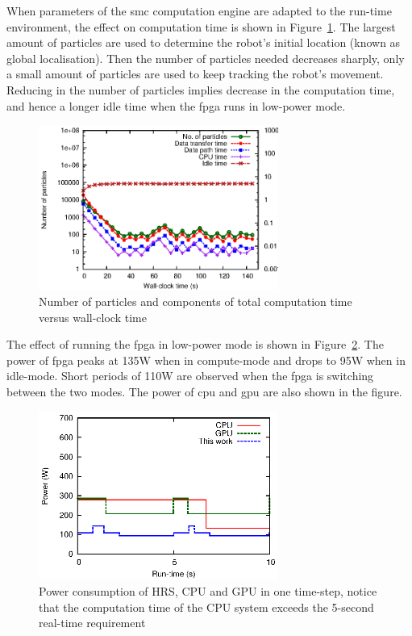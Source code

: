 When parameters of the \gls{smc} computation engine are adapted to the run-time environment, the effect on computation time is shown in Figure~\ref{fig:adaptiveb}.
The largest amount of particles are used to determine the robot's initial location (known as global localisation).
Then the number of particles needed decreases sharply, only a small amount of particles are used to keep tracking the robot's movement.
Reducing in the number of particles implies decrease in the computation time, and hence a longer idle time when the \gls{fpga} runs in low-power mode.

\begin{figure}[t!]
\centering
\includegraphics[width=0.7\textwidth]{4_adaptation/figures/fig_adaptive}
\caption{Number of particles and components of total computation time versus wall-clock time}
\label{fig:adaptiveb}
\end{figure}

The effect of running the \gls{fpga} in low-power mode is shown in Figure~\ref{fig:powerb}.
The power of \gls{fpga} peaks at 135W when in compute-mode and drops to 95W when in idle-mode.
Short periods of 110W are observed when the \gls{fpga} is switching between the two modes.
The power of \gls{cpu} and \gls{gpu} are also shown in the figure.

\begin{figure}[t!]
\centering
\includegraphics[width=0.7\textwidth]{5_tool/figures/fig_power}
\caption[Power consumption of HRS, CPU and GPU in one time-step, notice that the computation time of the CPU system exceeds the 5-second real-time requirement]{Power consumption of HRS, CPU and GPU in one time-step, notice that the computation time of the CPU system exceeds the 5-second real-time requirement}
\label{fig:powerb}
\end{figure}

